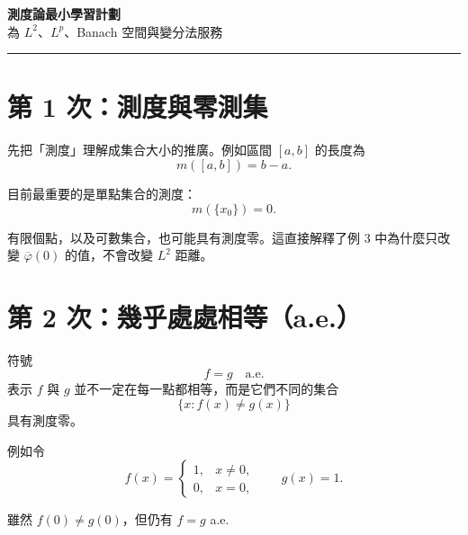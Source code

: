 \documentclass[11pt,a4paper,twoside]{article}
\newif\ifstudynotes
\newcommand{\StudyNote}[2]{%
  \ifstudynotes
    \begin{studyNote}[title={#1}]
      #2
    \end{studyNote}
  \fi
}
\newcommand{\ImportantNote}[2]{%
  \ifstudynotes
    \begin{importantNote}[title={#1}]
      #2
    \end{importantNote}
  \fi
}
\begin{document}
\begin{center}
    {\LARGE\bfseries 測度論最小學習計劃}\\[0.4em]
    {\large 為 $L^2$、$L^p$、Banach 空間與變分法服務}
\end{center}

\par\vspace{0.4em}\hrule\vspace{1em}

\ImportantNote{學習目標}{
    目前不需要完整學完測度論。這個模組只補足理解
    $L^2$、$L^p$、幾乎處處相等、完備化與函數收斂所需的最低限度知識。

    建議安排為四次學習，每次約 60 分鐘；完成後立刻回頭重讀例 3。
}

\section*{第 1 次：測度與零測集}

先把「測度」理解成集合大小的推廣。例如區間 $[a,b]$ 的長度為
\[
    m([a,b])=b-a.
\]

目前最重要的是單點集合的測度：
\[
    m(\{x_0\})=0.
\]

有限個點，以及可數集合，也可能具有測度零。這直接解釋了例 3 中為什麼只改變
$\overline{\varphi}(0)$ 的值，不會改變 $L^2$ 距離。

\ImportantNote{本節核心}{
    若兩個函數只在一個零測集上不同，則這些差異不會影響 Lebesgue 積分。

    特別地，若 $f$ 與 $g$ 只有在 $x=0$ 不同，則
    \[
        \int |f-g|^2\,dx=0.
    \]
}

\StudyNote{練習}{
    判斷下列集合哪些測度為零：
    \[
        \{0\},\qquad
        \{1,2,3\},\qquad
        \mathbb{Q}\cap[0,1],\qquad
        [0,1].
    \]
}

\section*{第 2 次：幾乎處處相等（a.e.）}

符號
\[
    f=g\quad \text{a.e.}
\]
表示 $f$ 與 $g$ 並不一定在每一點都相等，而是它們不同的集合
\[
    \{x:f(x)\neq g(x)\}
\]
具有測度零。

例如令
\[
    f(x)=
    \begin{cases}
        1, & x\neq0, \\
        0, & x=0,
    \end{cases}
    \qquad
    g(x)=1.
\]

雖然 $f(0)\neq g(0)$，但仍有 $f=g$ a.e.
\end{document}
